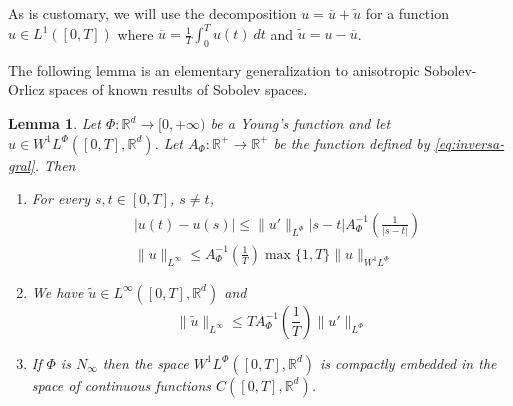 \documentclass[twoside]{article}
\newtheorem{lem}[thm]{Lemma}
\theoremstyle{remark}
\newcommand{\orlnor}{\|_{L^{\Phi}}}
\newcommand{\linf}{\|_{L^{\infty}}}
\newcommand{\lphi}{L^{\Phi}}
\newcommand{\wphi}{W^{1}\lphi}
\newcommand{\sobnor}{\|_{W^{1}\lphi}}
\newcommand{\rr}{\mathbb{R}}
\renewcommand{\leq}{\leqslant}
\begin{document}
 As is customary, we will use the decomposition $u=\overline{u}+\widetilde{u}$ for a function $u\in L^1([0,T])$  where $\overline{u} =\frac1T\int_0^T u(t)\ dt$ and $\widetilde{u}=u-\overline{u}$.

 The following lemma is an elementary generalization to anisotropic Sobolev-Orlicz spaces of known results of Sobolev spaces.



\begin{lem}\label{lem:inclusion orlicz} Let $\Phi:\rr^d\to [0,+\infty)$ be a Young's 
function and let $u\in\wphi\left([0,T],\rr^d\right)$. Let 
$A_{\Phi}: \rr^+ \to \rr^+$ be the function defined by \eqref{eq:inversa-gral}. Then
\begin{enumerate}
\item\label{inclusion orlicz_item1} For every $s,t\in [0,T]$, $s\neq t$,
\begin{align}
 &|u(t)-u(s)| \leq
 \|u'\orlnor |s-t|A_{\Phi}^{-1}\left(\frac{1}{|s-t|}\right)\tag{Morrey's inequality}\label{in-sob-cont}
\\
& \| u\linf \leq A_\Phi^{-1}\left(\frac{1}{T}\right)\max\{1,T\}\|u\sobnor\tag{Sobolev's inequality}\label{eq:sobolev}
\end{align}
\item We have $\widetilde{u}\in L^{\infty}\left([0,T],\rr^d\right)$ and
\[
\|\widetilde u \linf \leq T A_{\Phi}^{-1}\left(\frac{1}{T}\right)\|u'\orlnor
\tag{Sobolev-Wirtinger's inequality}\label{wirtinger}
\]
\item\label{it:embeding} If $\Phi$ is $N_{\infty}$ then the space $\wphi\left([0,T],\rr^d\right)$ is compactly embedded in the space of continuous functions $C\left([0,T],\rr^d\right)$.
\end{enumerate}
\end{lem}
\end{document}
